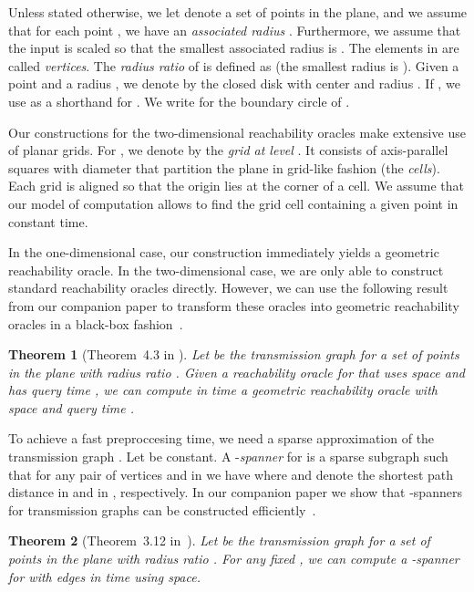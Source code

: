 \documentclass[11pt,a4paper]{paper}
\newtheorem{theorem}{Theorem}[section]
\begin{document}
Unless stated otherwise, we let  denote a set of
 points in the plane,
and we assume that for each point , we have an
\emph{associated radius} .
Furthermore, we assume that the input is scaled so that the smallest
associated radius is .
The elements in  are called \emph{vertices}.
The \emph{radius ratio}  of  is defined as
 (the 
smallest radius is ).
Given a point  and a radius , we denote by 
the closed disk with center  and radius . If , we
use  as a shorthand for . We write
 for the boundary circle of .

Our constructions for the two-dimensional reachability oracles make extensive
use of planar grids. For ,
we denote by   the \emph{grid at level }. It consists of
axis-parallel squares with diameter  that partition the
plane in grid-like fashion (the \emph{cells}).
Each grid  is aligned so that the origin lies at the corner of a cell.
We assume that our model of computation allows to
 find
the grid cell containing a given point
  in constant time.

In the one-dimensional case, our construction immediately yields a geometric
reachability oracle. In the two-dimensional case, we are only able to
construct standard reachability oracles directly. However, we can use the following
result from our companion paper to transform these oracles into geometric reachability
oracles in a black-box fashion~\cite{KaplanEtAl15}.

\begin{theorem}[Theorem~4.3 in \cite{KaplanEtAl15}]
\label{thm:geometricreachability}
Let  be the transmission graph for a set  of  points in the plane with radius
ratio . Given a reachability oracle for  that uses  space and
has query time , we can compute in  time a
geometric reachability oracle with   space and
query time .
\end{theorem}

To achieve a fast preproccesing time, we need  a sparse approximation of
the transmission graph . Let 
be constant.
A -\emph{spanner} for  is a sparse subgraph  such
that for any pair of vertices  and  in  we have  where  and  denote the shortest path distance in
 and in , respectively. In our
companion paper we show that -spanners for transmission graphs can be
constructed efficiently~\cite{KaplanEtAl15}.
\begin{theorem}[Theorem~3.12 in~\cite{KaplanEtAl15}]
\label{thm:2dspanner}
  Let  be the transmission graph for a set  of
   points in the plane
  with radius ratio . For any fixed ,
  we can compute
  a -spanner for  with  edges in  time
  using   space.
\end{theorem}
\end{document}
